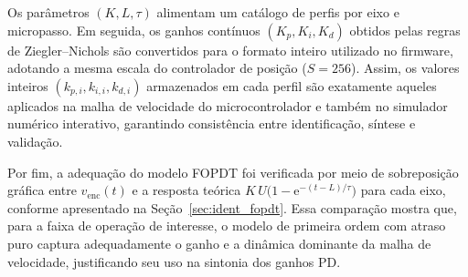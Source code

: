 Os parâmetros $(K,L,\tau)$ alimentam um catálogo de perfis por eixo e
micro\-passo. Em seguida, os ganhos contínuos $(K_p,K_i,K_d)$ obtidos
pelas regras de Ziegler–Nichols são convertidos para o formato inteiro
utilizado no firmware, adotando a mesma escala do controlador de
posição ($S = 256$). Assim, os valores inteiros $(k_{p,i},k_{i,i},k_{d,i})$
armazenados em cada perfil são exatamente aqueles aplicados na malha de
velocidade do microcontrolador e também no simulador numérico
interativo, garantindo consistência entre identificação, síntese e
validação.

Por fim, a adequação do modelo FOPDT foi verificada por meio de
sobreposição gráfica entre $v_\text{enc}(t)$ e a resposta teórica
$K\,U\bigl(1-\mathrm{e}^{-(t-L)/\tau}\bigr)$ para cada eixo, conforme
apresentado na Seção~\ref{sec:ident_fopdt}. Essa comparação mostra que,
para a faixa de operação de interesse, o modelo de primeira ordem com
atraso puro captura adequadamente o ganho e a dinâmica dominante da
malha de velocidade, justificando seu uso na sintonia dos ganhos PD.

